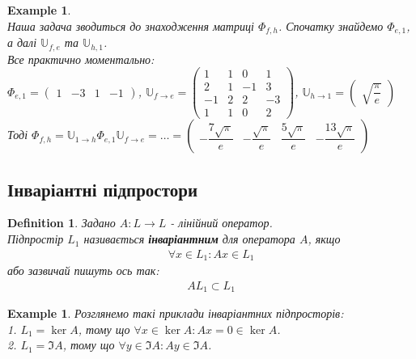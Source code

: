 \documentclass[a4paper, 10pt]{article}
\theoremstyle{theoremdd}
\newtheorem{definition}[theorem]{Definition}
\newtheorem{example}[theorem]{Example}
\begin{document}
\begin{example}
\\
Наша задача зводиться до знаходження матриці $\Phi_{f,h}$. Спочатку знайдемо $\Phi_{e,1}$, а далі $\mathbb{U}_{f,e}$ та $\mathbb{U}_{h,1}$.\\
Все практично моментально: \\
$\Phi_{e,1} = \begin{pmatrix}
1 & -3 & 1 & -1
\end{pmatrix}$, \hspace{0.5cm} $\mathbb{U}_{f \to e} = \begin{pmatrix}
1 & 1 & 0 & 1 \\
2 & 1 & -1 & 3 \\
-1 & 2 & 2 & -3 \\
1 & 1 & 0 & 2
\end{pmatrix}$, \hspace{0.5cm} $\mathbb{U}_{h \to 1} = \begin{pmatrix}
\sqrt{\dfrac{\pi}{e}}
\end{pmatrix}$\\
Тоді $\Phi_{f,h} = \mathbb{U}_{1 \to h} \Phi_{e,1} \mathbb{U}_{f \to e} = \dots = \begin{pmatrix}
-\dfrac{7\sqrt{\pi}}{e} & -\dfrac{\sqrt{\pi}}{e} & \dfrac{5\sqrt{\pi}}{e} & -\dfrac{13\sqrt{\pi}}{e}
\end{pmatrix}$
\end{example}

\subsection{Інваріантні підпростори}
\begin{definition}
Задано $A: L \to L$ - лінійний оператор.\\
Підпростір $L_1$ називається \textbf{інваріантним} для оператора $A$, якщо
\begin{align*}
\forall x \in L_1: Ax \in L_1
\end{align*}
або зазвичай пишуть ось так:
\begin{align*}
AL_1 \subset L_1
\end{align*}
\end{definition}

\begin{example} Розглянемо такі приклади інваріантних підпросторів:\\
1. $L_1 = \ker A$, тому що $\forall x \in \ker A: Ax = 0 \in \ker A$.\\
2. $L_1 = \Im A$, тому що $\forall y \in \Im A: Ay \in \Im A$.
\end{example}
\end{document}
